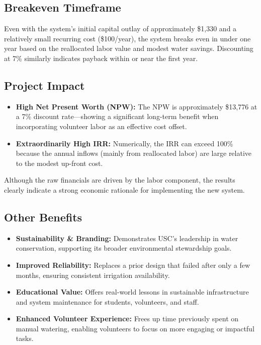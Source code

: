 \documentclass[12pt]{article}
\begin{document}
\subsection*{Breakeven Timeframe}
Even with the system’s initial capital outlay of approximately \$1,330 and a relatively small recurring cost (\$100/year), the system breaks even in under one year based on the reallocated labor value and modest water savings. Discounting at 7\% similarly indicates payback within or near the first year. 

\subsection*{Project Impact}
\begin{itemize}
    \item \textbf{High Net Present Worth (NPW):} 
    The NPW is approximately \$13,776 at a 7\% discount rate—showing a significant long-term benefit when incorporating volunteer labor as an effective cost offset.
    \item \textbf{Extraordinarily High IRR:} 
    Numerically, the IRR can exceed 100\% because the annual inflows (mainly from reallocated labor) are large relative to the modest up-front cost.
\end{itemize}
Although the raw financials are driven by the labor component, the results clearly indicate a strong economic rationale for implementing the new system.

\subsection*{Other Benefits}
\begin{itemize}
    \item \textbf{Sustainability \& Branding:} Demonstrates USC's leadership in water conservation, supporting its broader environmental stewardship goals.
    \item \textbf{Improved Reliability:} Replaces a prior design that failed after only a few months, ensuring consistent irrigation availability.
    \item \textbf{Educational Value:} Offers real-world lessons in sustainable infrastructure and system maintenance for students, volunteers, and staff.
    \item \textbf{Enhanced Volunteer Experience:} Frees up time previously spent on manual watering, enabling volunteers to focus on more engaging or impactful tasks.
\end{itemize}
\end{document}

